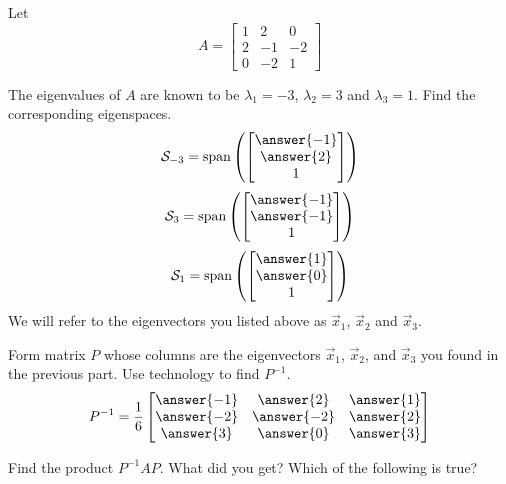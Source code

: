 \documentclass{ximera}
\begin{document}
\begin{problem}
    Let $$A=\begin{bmatrix}1 & 2 & 0\\2 & -1 & -2\\0 & -2 & 1\end{bmatrix}$$
    \begin{question}
    The eigenvalues of $A$ are known to be $\lambda_1=-3$, $\lambda_2=3$ and $\lambda_3=1$.
    Find the corresponding eigenspaces.
$$\mathcal{S}_{-3}=\text{span}\left(\begin{bmatrix}\answer{-1}\\\answer{2}\\1\end{bmatrix}\right)$$
$$\mathcal{S}_3=\text{span}\left(\begin{bmatrix}\answer{-1}\\\answer{-1}\\1\end{bmatrix}\right)$$
$$\mathcal{S}_1=\text{span}\left(\begin{bmatrix}\answer{1}\\\answer{0}\\1\end{bmatrix}\right)$$
We will refer to the eigenvectors you listed above as $\vec{x}_1$, $\vec{x}_2$ and $\vec{x}_3$.
\end{question}
\begin{question}
    Form matrix $P$ whose columns are the eigenvectors $\vec{x}_1$, $\vec{x}_2$, and $\vec{x}_3$ you found in the previous part.  Use technology to find $P^{-1}$.
    $$P^{-1}=\frac{1}{6}\begin{bmatrix}\answer{-1} & \answer{2} & \answer{1}\\\answer{-2} & \answer{-2} & \answer{2}\\\answer{3} & \answer{0} & \answer{3}\end{bmatrix}$$
\end{question}
\begin{question}
    Find the product $P^{-1}AP$.  What did you get?
    Which of the following is true?
    \begin{multipleChoice}
    \end{multipleChoice}
\end{question}

\end{problem}
\end{document}
